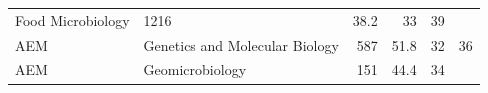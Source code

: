 \documentclass[11pt,]{article}
\begin{document}
\begin{longtable}[]{@{}llrrrr@{}}
\begin{minipage}[t]{0.43\columnwidth}
Food Microbiology\strut
\end{minipage} & \begin{minipage}[t]{0.04\columnwidth}\raggedleft\strut
1216\strut
\end{minipage} & \begin{minipage}[t]{0.08\columnwidth}\raggedleft\strut
38.2\strut
\end{minipage} & \begin{minipage}[t]{0.11\columnwidth}\raggedleft\strut
33\strut
\end{minipage} & \begin{minipage}[t]{0.11\columnwidth}\raggedleft\strut
39\strut
\end{minipage}\tabularnewline
\begin{minipage}[t]{0.06\columnwidth}\raggedright\strut
AEM\strut
\end{minipage} & \begin{minipage}[t]{0.43\columnwidth}\raggedright\strut
Genetics and Molecular Biology\strut
\end{minipage} & \begin{minipage}[t]{0.04\columnwidth}\raggedleft\strut
587\strut
\end{minipage} & \begin{minipage}[t]{0.08\columnwidth}\raggedleft\strut
51.8\strut
\end{minipage} & \begin{minipage}[t]{0.11\columnwidth}\raggedleft\strut
32\strut
\end{minipage} & \begin{minipage}[t]{0.11\columnwidth}\raggedleft\strut
36\strut
\end{minipage}\tabularnewline
\begin{minipage}[t]{0.06\columnwidth}\raggedright\strut
AEM\strut
\end{minipage} & \begin{minipage}[t]{0.43\columnwidth}\raggedright\strut
Geomicrobiology\strut
\end{minipage} & \begin{minipage}[t]{0.04\columnwidth}\raggedleft\strut
151\strut
\end{minipage} & \begin{minipage}[t]{0.08\columnwidth}\raggedleft\strut
44.4\strut
\end{minipage} & \begin{minipage}[t]{0.11\columnwidth}\raggedleft\strut
34\strut
\end{minipage} & \begin{minipage}[t]{0.11\columnwidth}\raggedleft\strut

\end{minipage}
\end{longtable}
\end{document}
